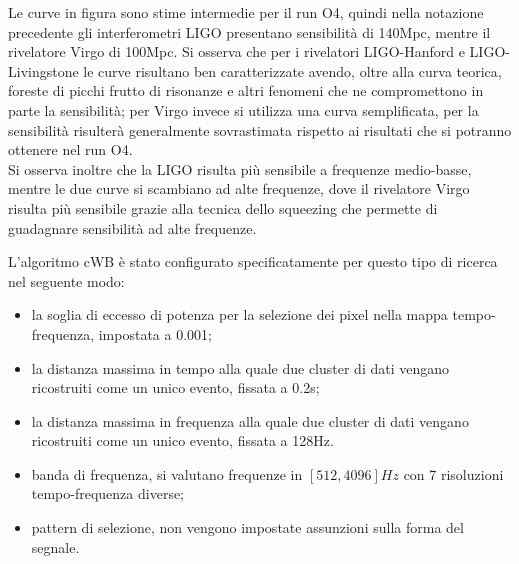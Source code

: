 Le curve in figura sono stime intermedie per il run O4, quindi nella notazione precedente gli interferometri LIGO presentano sensibilità di 140Mpc, mentre il rivelatore Virgo di 100Mpc.
Si osserva che per i rivelatori LIGO-Hanford e LIGO-Livingstone le curve risultano ben caratterizzate avendo, oltre alla curva teorica, foreste di picchi frutto di risonanze e altri fenomeni che ne compromettono in parte la sensibilità; per Virgo invece si utilizza una curva semplificata, per la sensibilità risulterà generalmente sovrastimata rispetto ai risultati che si potranno ottenere nel run O4.\\
Si osserva inoltre che la LIGO risulta più sensibile a frequenze medio-basse, mentre le due curve si scambiano ad alte frequenze, dove il rivelatore Virgo risulta più sensibile grazie alla tecnica dello squeezing che permette di guadagnare sensibilità ad alte frequenze.

L'algoritmo cWB è stato configurato specificatamente per questo tipo di ricerca nel seguente modo:
\begin{itemize}
	\item la soglia di eccesso di potenza per la selezione dei pixel nella mappa tempo-frequenza, impostata a 0.001;
	\item la distanza massima in tempo alla quale due cluster di dati vengano ricostruiti come un unico evento, fissata a 0.2s;
	\item la distanza massima in frequenza alla quale due cluster di dati vengano ricostruiti come un unico evento, fissata a 128Hz.
	\item banda di frequenza, si valutano frequenze in $[512, 4096]Hz$ con 7 risoluzioni tempo-frequenza diverse;
	\item pattern di selezione, non vengono impostate assunzioni sulla forma del segnale.
\end{itemize}

